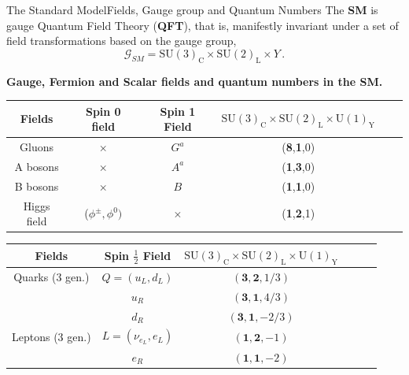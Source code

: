 \documentclass[10pt,xcolor=dvipsnames,mathserif]{beamer}
\begin{document}
    \begin{frame}{The Standard Model}{Fields, Gauge group and Quantum Numbers}
    The \textbf{SM} is gauge Quantum Field Theory (\textbf{QFT}), that is, manifestly invariant under a set of field transformations based on the gauge group,
    \begin{equation*}
        \mathcal{G}_{SM} = \mathrm{SU}(3)_{\mathrm{C}} \times \mathrm{SU}(2)_{\mathrm{L}} \times {Y} \, .
    \end{equation*}
    \begin{center}
        \textbf{Gauge, Fermion and Scalar fields and quantum numbers in the SM.} 
    \end{center}
    \begin{table}[!htb]
	\centering
    	\begin{tabular}{@{}cccccc@{}}
    		\hline	
    		Fields & Spin 0 field & Spin 1 Field & $ \mathrm{ SU(3)_C \times SU(2)_L \times U(1)_Y } $  \\
    		\hline	
    		Gluons  & $\times$  & $G^a$ & (\textbf{8},\textbf{1},0) \\	
    		A bosons & $\times$  & $A^a$ & (\textbf{1},\textbf{3},0)   \\
    		B bosons & $\times$  & $B$   & (\textbf{1},\textbf{1},0)   \\
    		Higgs field & ($\phi^\pm, \phi^0 )$  & $\times$ & (\textbf{1},\textbf{2},1) \\ \hline
    	\end{tabular}
    \end{table}
    \begin{table}[!htb]
	    \centering
	    \begin{tabular}{@{}cccccc@{}}
    		\hline	
    		Fields & Spin $\frac{1}{2}$ Field & $\mathrm{ SU(3)_C \times SU(2)_L \times U(1)_Y} $   \\
    		\hline	
    		Quarks (3 gen.) & $Q=(u_L,d_L)$ & $(\mathbf{3},\mathbf{2},{1}/{3})$ \\	
    		$\quad$        & $u_R$ & $(\mathbf{3},\mathbf{1},{4}/{3})$   \\
    		$\quad$   & $d_R$ & $(\mathbf{3},\mathbf{1}, -{2}/{3})$   \\
    		Leptons (3 gen.) & $L=(\nu_{e_L}, e_L )$ & $(\mathbf{1},\mathbf{2},-1)$  \\
    		$\quad$   & $e_R$ & $(\mathbf{1},\mathbf{1},-2)   $ \\ \hline
    	\end{tabular}
    \end{table}
    \end{frame}
\end{document}
